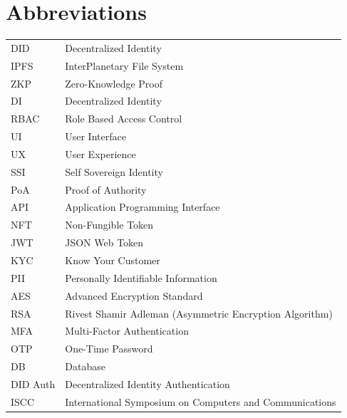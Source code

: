 \chapter*{Abbreviations}\label{LstAbb} 

\begin{flushleft}
\begin{longtable}{lp{11cm}}
	
DID & Decentralized Identity \\
IPFS & InterPlanetary File System\\
ZKP & Zero-Knowledge Proof\\
DI & Decentralized Identity \\
RBAC & Role Based Access Control \\
UI & User Interface \\
UX & User Experience\\
SSI & Self Sovereign Identity\\
PoA & Proof of Authority\\
API & Application Programming Interface\\
NFT & Non-Fungible Token\\
JWT & JSON Web Token\\
KYC & Know Your Customer\\
PII & Personally Identifiable Information\\
AES & Advanced Encryption Standard\\
RSA & Rivest Shamir Adleman (Asymmetric Encryption Algorithm)\\
MFA & Multi-Factor Authentication\\
OTP & One-Time Password\\
DB & Database\\
DID Auth & Decentralized Identity Authentication\\
ISCC & International Symposium on Computers and Communications\\

\end{longtable}
\end{flushleft}
